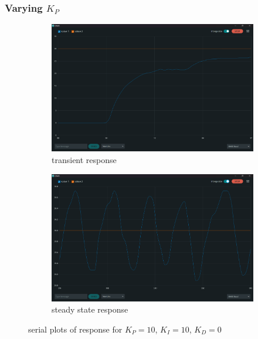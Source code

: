 \documentclass[12pt]{article}
\begin{document}
\pagebreak

\subsubsection{Varying $K_P$}

\begin{figure}[h]
    \centering
    \begin{subfigure}{.44\textwidth}
        \centering
        \includegraphics[width=0.95\linewidth]{images/q1/Transient_10_10_0.png}
		\caption{transient response}
    \end{subfigure}
    \begin{subfigure}{.44\textwidth}
        \centering
        \includegraphics[width=0.95\linewidth]{images/q1/SS_10_10_0.png} 
		\caption{steady state response}
    \end{subfigure}\vspace{-1mm}
    \caption{serial plots of response for $K_P=10$, $K_I=10$, $K_D=0$}
\end{figure}
\vspace{-5mm}
\end{document}
